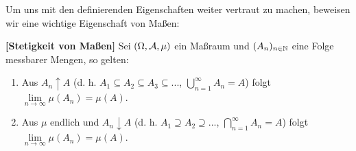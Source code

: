 Um uns mit den definierenden Eigenschaften weiter vertraut zu machen, beweisen wir eine wichtige Eigenschaft von Ma\ss en:




\marginpar{\textcolor{red}{Vorlesung 2}}

\begin{lAussageWerkzeug}
\begin{satz}\label{S1}  \textbf{[Stetigkeit von Maßen]}
	Sei $(\Omega, \mathcal{A}, \mu)$ ein Maßraum und $(A_n)_{n\in \mathbb{N}}$ eine Folge messbarer Mengen, so gelten:
	\begin{enumerate}[label=(\roman*)]
		\item Aus $A_n \uparrow A$ (d. h. $A_1 \subseteq A_2 \subseteq A_3\subseteq ...$, $\bigcup_{n=1}^{\infty} A_n = A$) folgt $\lim\limits_{n \to \infty} \mu (A_n)= \mu (A)$.
		\item Aus $\mu$ endlich und $A_n \downarrow A$ (d. h. $A_1 \supseteq A_2 \supseteq ...$, $\bigcap\limits_{n=1}^{\infty}A_n=A$) folgt $\lim\limits_{n \to \infty}\mu (A_n)=\mu(A)$.
	\end{enumerate}
\end{satz}
\end{lAussageWerkzeug}

